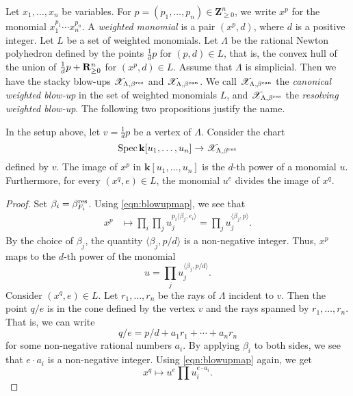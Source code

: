 \documentclass{amsart}
\renewcommand{\k}{\mathbf k}
\begin{document}
Let \(x_1, \dots, x_n\) be variables.
For \(p = (p_1, \dots, p_n) \in \mathbf{Z}^n_{\geq 0}\), we write \(x^p\) for the monomial \(x_1^{p_1}\cdots x_n^{p_n}\).
A \emph{weighted monomial} is a pair \((x^p,d)\), where \(d\) is a positive integer.
Let \(L\) be a set of weighted monomials.
Let \(\Lambda\) be the rational Newton polyhedron defined by the points \(\frac{1}{d} p\) for \((p,d) \in L\), that is, the convex hull of the union of \(\frac{1}{d} p + {\bf R}^n_{\geq 0}\) for \((x^p,d) \in L\).
Assume that \(\Lambda\) is simplicial.
Then we have the stacky blow-ups \(\mathscr X_{\Lambda, \beta^{\rm res}}\) and \(\mathscr X_{\Lambda, \beta^{\rm can}}\).
We call \(\mathscr X_{\Lambda, \beta^{\rm can}}\) the \emph{canonical weighted blow-up} in the set of weighted monomials \(L\), and \(\mathscr X_{\Lambda, \beta^{\rm res}}\) the \emph{resolving weighted blow-up}.
The following two propositions justify the name.
\begin{proposition}\label{prop:monomial}
  In the setup above, let \(v = \frac{1}{d} p\) be a vertex of \(\Lambda\).
  Consider the chart
  \[ \spec \k[u_1, \dots, u_n]  \to \mathscr X_{\Lambda, \beta^{\rm res}}\]
  defined by \(v\).
  The image of \(x^p\) in \(\k[u_1,\dots,u_n]\) is the \(d\)-th power of a monomial \(u\).
  Furthermore, for every \((x^q,e) \in L\), the monomial \(u^e\) divides the image of \(x^q\).
\end{proposition}
\begin{proof}
  Set \(\beta_i = \beta^{\rm res}_{F_i}\).
  Using \eqref{eqn:blowupmap}, we see that
  \begin{align*}
    x^p &\mapsto \prod_i \prod_j u_j^{p_i\langle \beta_j, e_i \rangle} =  \prod_j u_j^{\langle \beta_j, p \rangle}.
  \end{align*}
  By the choice of \(\beta_j\), the quantity \(\langle  \beta_j, p/d \rangle\) is a non-negative integer.
  Thus, \(x^p\) maps to the \(d\)-th power of the monomial
  \[ u = \prod_j u_{j}^{\langle  \beta_j, p/d \rangle}.\]
  Consider \((x^q,e) \in L\).
  Let \(r_1, \dots, r_n\) be the rays of \(\Lambda\) incident to \(v\).
  Then the point \(q/e\) is in the cone defined by the vertex \(v\) and the rays spanned by \(r_1,\dots, r_n\).
  That is, we can write
  \[ q/e = p/d + a_1 r_1 + \cdots + a_nr_n\]
  for some non-negative rational numbers \(a_i\).
  By applying \(\beta_i\) to both sides, we see that \(e \cdot a_i\) is a non-negative integer.
  Using \eqref{eqn:blowupmap} again, we get 
  \[ x^q \mapsto u^e \prod u_i^{e \cdot a_i}.\]
\end{proof}
\end{document}
